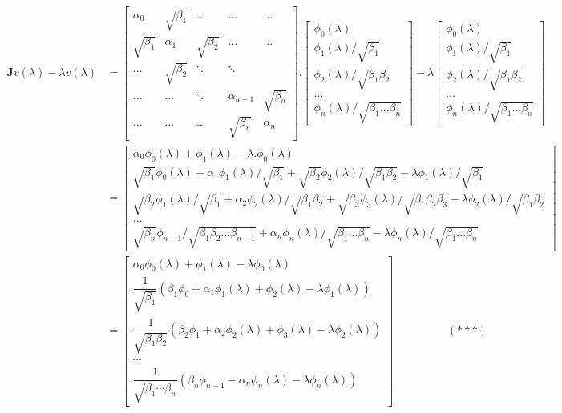 \documentclass[14pt,a4paper]{article}
\begin{document}
\begin{enumerate}
	\begin{align*} \textbf{J}v(\lambda) - \lambda v(\lambda) &= \begin{bmatrix} \alpha_0 & \sqrt{\beta_1} & ... & ... & ... \\ \sqrt{\beta_1} & \alpha_1 & \sqrt{\beta_2} & ... & ... \\ ... & \sqrt{\beta_2} & \ddots & \ddots \\ ... & ... & \ddots & \alpha_{n-1} & \sqrt{\beta_n} \\ ... & ... & ... & \sqrt{\beta_n} & \alpha_n \end{bmatrix}.\begin{bmatrix} \phi_0(\lambda) \\ \phi_1(\lambda)/\sqrt{\beta_1} \\ \phi_2(\lambda)/\sqrt{\beta_1\beta_2} \\ ... \\ \phi_n(\lambda)/\sqrt{\beta_1...\beta_n} \end{bmatrix} - \lambda\begin{bmatrix} \phi_0(\lambda) \\ \phi_1(\lambda)/\sqrt{\beta_1} \\ \phi_2(\lambda)/\sqrt{\beta_1\beta_2} \\ ... \\ \phi_n(\lambda)/\sqrt{\beta_1...\beta_n} \end{bmatrix}\\
	&= \begin{bmatrix} \alpha_0\phi_0(\lambda) + \phi_1(\lambda) - \lambda. \phi_0(\lambda)\\ \sqrt{\beta_1}\phi_0(\lambda) + \alpha_1\phi_1(\lambda)/\sqrt{\beta_1} + \sqrt{\beta_2}\phi_2(\lambda)/\sqrt{\beta_1\beta_2} - \lambda\phi_1(\lambda)/\sqrt{\beta_1} \\ \sqrt{\beta_2}\phi_1(\lambda)/\sqrt{\beta_1} + \alpha_2\phi_2(\lambda)/\sqrt{\beta_1\beta_2} + \sqrt{\beta_3}\phi_3(\lambda)/\sqrt{\beta_1\beta_2\beta_3} - \lambda\phi_2(\lambda)/\sqrt{\beta_1\beta_2} \\ ... \\ \sqrt{\beta_n}\phi_{n-1}/\sqrt{\beta_1\beta_2...\beta_{n-1}} + \alpha_n\phi_n(\lambda)/\sqrt{\beta_1...\beta_n} - \lambda \phi_n(\lambda)/\sqrt{\beta_1...\beta_n} \end{bmatrix} \\
	&= \begin{bmatrix} \alpha_0\phi_0(\lambda) + \phi_1(\lambda) - \lambda\phi_0(\lambda) \\ \dfrac{1}{\sqrt{\beta_1}}\left( \beta_1\phi_0 + \alpha_1\phi_1(\lambda) + \phi_2(\lambda) - \lambda\phi_1(\lambda) \right) \\ \dfrac{1}{\sqrt{\beta_1\beta_2}}\left( \beta_2\phi_1 + \alpha_2\phi_2(\lambda) + \phi_3(\lambda) - \lambda\phi_2(\lambda) \right) \\ \cdots \\ \dfrac{1}{\sqrt{\beta_1\cdots\beta_n}}\left( \beta_n\phi_{n-1} + \alpha_n\phi_n(\lambda) - \lambda\phi_n(\lambda) \right)\end{bmatrix} \hspace{2cm} (***)\end{align*}
	

\end{enumerate}
\end{document}
